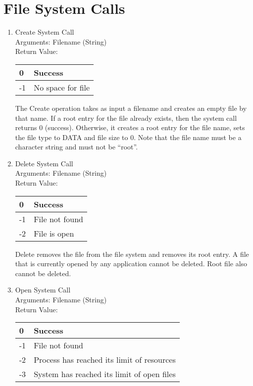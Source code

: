 \section{File System Calls}
\begin{enumerate}
\item{Create System Call}\\
Arguments: Filename (String)\\
Return Value:
\FloatBarrier \begin{table}[H]
\centering
\begin{tabular}{|l|l|}
\hline
0  & Success           \\ \hline
-1 & No space for file \\ \hline
\end{tabular}
\end{table} \FloatBarrier 

The Create operation takes as input a filename and creates an empty file by that name. If a root entry for the file already exists, then the system call returns 0 (success). Otherwise, it creates a root entry for the file name, sets the file type to DATA and file size to 0. Note that the file name must be a character string and must not be “root”. 


\item{Delete System Call}\\
Arguments: Filename (String)\\
Return Value:
\FloatBarrier \begin{table}[H]
\centering
\begin{tabular}{|l|l|}
\hline
0  & Success           \\ \hline
-1 & File not found \\ \hline
-2 & File is open \\ \hline
\end{tabular}
\end{table} \FloatBarrier 

Delete removes the file from the file system and removes its root entry. A file that is currently opened by any application cannot be deleted. Root file also cannot be deleted.
 

\item{Open System Call}\\
Arguments: Filename (String)\\
Return Value:
\FloatBarrier \begin{table}[H]
\centering
\begin{tabular}{|l|l|}
\hline
0  & Success           \\ \hline
-1 & File not found \\ \hline
-2 & Process has reached its limit of resources \\ \hline
-3 & System has reached its limit of open files \\ \hline
\end{tabular}
\end{table} \FloatBarrier 


\end{enumerate}
